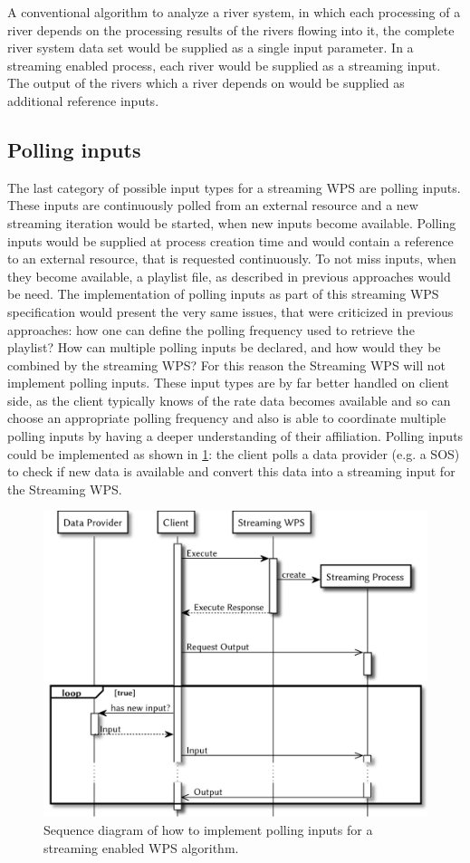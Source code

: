       A conventional algorithm to analyze a river system, in which each processing of a river depends on the processing results of the rivers flowing into it, the complete river system data set would be supplied as a single input parameter. In a streaming enabled process, each river would be supplied as a streaming input. The output of the rivers which a river depends on would be supplied as additional reference inputs.
    \subsection{Polling inputs}
      \label{sec:stream:input:polling}
      The last category of possible input types for a streaming \ac{WPS} are polling inputs. These inputs are continuously polled from an external resource and a new streaming iteration would be started, when new inputs become available. Polling inputs would be supplied at process creation time and would contain a reference to an external resource, that is requested continuously. To not miss inputs, when they become available, a playlist file, as described in previous approaches \citep{foerster2012live} would be need. The implementation of polling inputs as part of this streaming \ac{WPS} specification would present the very same issues, that were criticized in previous approaches: how one can define the polling frequency used to retrieve the playlist? How can multiple polling inputs be declared, and how would they be combined by the streaming \ac{WPS}? For this reason the Streaming \ac{WPS} will not implement polling inputs. These input types are by far better handled on client side, as the client typically knows of the rate data becomes available and so can choose an appropriate polling frequency and also is able to coordinate multiple polling inputs by having a deeper understanding of their affiliation. Polling inputs could be implemented as shown in \cref{fig:sd:polling}: the client polls a data provider (e.g. a \ac{SOS}) to check if new data is available and convert this data into a streaming input for the Streaming \ac{WPS}.
      \begin{figure}[!htb]
        \centering
        \includegraphics[width=0.73521126760563382\linewidth]{figures/sequence-diagramm-polling.pdf}
        \caption{\label{fig:sd:polling}Sequence diagram of how to implement polling inputs for a streaming enabled WPS algorithm.}
      \end{figure}

